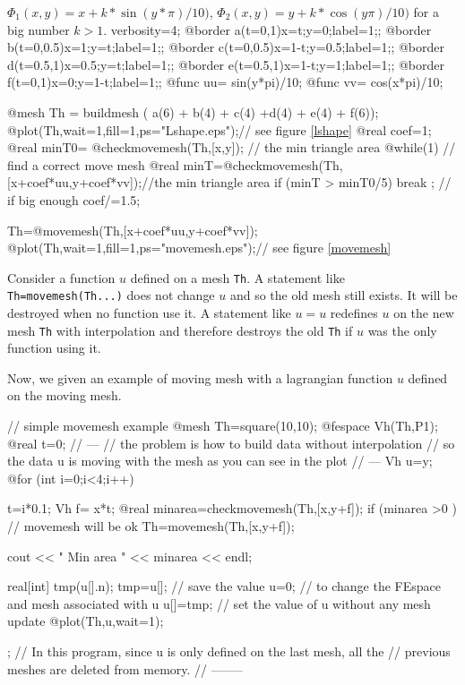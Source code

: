 \documentclass[a4paper,twoside,12pt]{book}
\begin{document}
\begin{example} $\Phi_1(x,y)=x+k*\sin(y*\pi)/10)$,
$\Phi_2(x,y)=y+k*\cos(y\pi)/10)$ for a big number $k>1$.
\bFF
verbosity=4;
@border a(t=0,1){x=t;y=0;label=1;};
@border b(t=0,0.5){x=1;y=t;label=1;};
@border c(t=0,0.5){x=1-t;y=0.5;label=1;};
@border d(t=0.5,1){x=0.5;y=t;label=1;};
@border e(t=0.5,1){x=1-t;y=1;label=1;};
@border f(t=0,1){x=0;y=1-t;label=1;};
@func uu= sin(y*pi)/10;
@func vv= cos(x*pi)/10;

@mesh Th = buildmesh ( a(6) + b(4) + c(4) +d(4) + e(4) + f(6));
@plot(Th,wait=1,fill=1,ps="Lshape.eps");// see figure \ref{lshape}
@real coef=1;
@real minT0= @checkmovemesh(Th,[x,y]); // the min triangle area
@while(1) // find a correct move mesh
{
  @real minT=@checkmovemesh(Th,[x+coef*uu,y+coef*vv]);//the min triangle area
  if (minT > minT0/5) break ; // if big enough
  coef/=1.5;
}

Th=@movemesh(Th,[x+coef*uu,y+coef*vv]);
@plot(Th,wait=1,fill=1,ps="movemesh.eps");// see figure \ref{movemesh}
\eFF

\end{example}
\begin{note}
Consider a function $u$ defined on a mesh \texttt{Th}. A statement like
\texttt{Th=movemesh(Th...)} does not change $u$ and so the old mesh
still exists. It will be destroyed when no function use it. A
statement like $u=u$ redefines $u$ on the new mesh \texttt{Th} with
interpolation and therefore destroys the old \texttt{Th} if $u$ was the only
function using it.
\end{note}

\begin{example}
Now, we given an example of moving mesh with a lagrangian
function $u$ defined on the moving mesh.

\bFF
// simple movemesh example
@mesh Th=square(10,10);
@fespace Vh(Th,P1);
@real t=0;
// ---
//  the problem is how to build data without interpolation
//  so the data u is moving with the mesh as you can see in the plot
// ---
Vh u=y;
@for (int i=0;i<4;i++)
{
 t=i*0.1;
 Vh f= x*t;
 @real minarea=checkmovemesh(Th,[x,y+f]);
 if (minarea >0 ) // movemesh will be ok
   Th=movemesh(Th,[x,y+f]);

 cout << " Min area  " << minarea << endl;

 real[int] tmp(u[].n);
 tmp=u[];  // save the value
 u=0;        // to change the FEspace and mesh associated with u
 u[]=tmp;  // set the value of u without any mesh update
 @plot(Th,u,wait=1);
};
// In this program, since u is only defined on the last mesh, all the \hfilll
// previous meshes are deleted from memory.  \hfilll
//   --------  \hfilll
\eFF
\end{example}
\end{document}

